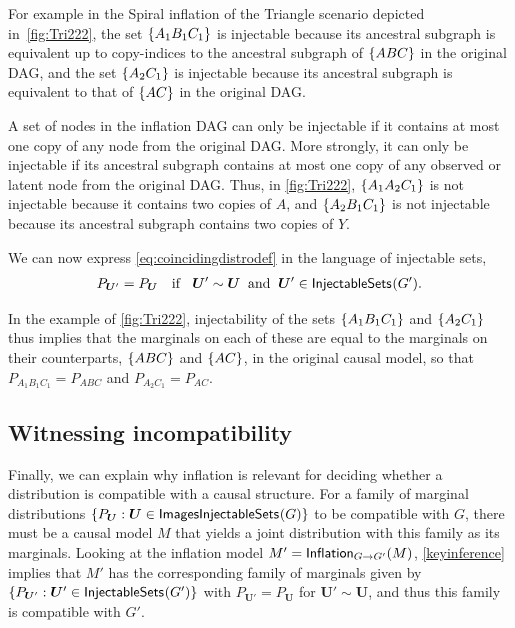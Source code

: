 \documentclass[aps,english,superscriptaddress,onecolumn,twoside,longbibliography,pra,floatfix,fleqn,nofootinbib]{revtex4-1}%
\theoremstyle{definition}
\newcounter{example}[section]
\newcommand{\SmallNamedFunction}[3][]{\operatorname{\mathsf{#2}}_{#1}\parenths{#3}}
\DeclarePairedDelimiter{\parenths}{\lparen}{\rparen}
\DeclarePairedDelimiter{\braces}{\lbrace}{\rbrace}
\newcommand{\brackets}[1]{\braces*{#1}}
\begin{document}
For example in the Spiral inflation of the Triangle scenario depicted in~\cref{fig:Tri222}, the set $\brackets{A_1 B_1 C_1}$ is injectable because its ancestral subgraph is equivalent up to copy-indices to the ancestral subgraph of $\brackets{A B C}$ in the original DAG, and the set $\brackets{A_2 C_1}$ is injectable because its ancestral subgraph is equivalent to that of $\brackets{ A C}$ in the original DAG. 

A set of nodes in the inflation DAG can only be injectable if it contains at most one copy of any node from the original DAG. More strongly, it can only be injectable if its ancestral subgraph contains at most one copy of any observed or latent node from the original DAG.  
Thus, in \cref{fig:Tri222}, $\brackets{A_1 A_2 C_1}$ is not injectable because it contains two copies of $A$, and $\brackets{A_2 B_1 C_1}$ is not injectable because its ancestral subgraph contains two copies of $Y$. 

We can now express \cref{eq:coincidingdistrodef} in the language of injectable sets,
\begin{align}\label{keyinference}
P_{\bm{U}'}=P_{\bm{U}}\quad\text{if }  \;\; \bm{U}' \sim \bm{U}\;\; \text{and} \;\; \bm{U}'\in\SmallNamedFunction{InjectableSets}{G'}.
\end{align}

In the example of \cref{fig:Tri222}, injectability of the sets $\brackets{A_1 B_1 C_1}$ and $\brackets{A_2 C_1}$ thus implies that the marginals on each of these are equal to the marginals on their counterparts, $\brackets{A B C}$ and $\brackets{A C}$, in the original causal model, so that $P_{A_1 B_1 C_1} = P_{A B C}$ and $P_{A_2 C_1} = P_{A C}$.

\subsection{Witnessing incompatibility}
\label{subsec:witnessingincompat}

Finally, we can explain why inflation is relevant for deciding whether a distribution is compatible with a causal structure.  For a family of marginal distributions $\{ P_{\bm{U}} : \bm{U} \in \SmallNamedFunction{ImagesInjectableSets}{G}\}$ to be compatible with $G$, there must be a causal model $M$ that yields a joint distribution with this family as its marginals. Looking at the inflation model $M' = \SmallNamedFunction[G\to G']{Inflation}{M}$, \cref{keyinference} implies that $M'$ has the corresponding family of marginals given by $\{ P_{\bm{U}'} : \bm{U}' \in \SmallNamedFunction{InjectableSets}{G'}\}$ with $P_{\bm{U}'} = P_{\bm{U}}$ for $\bm{U}'\sim\bm{U}$, and thus this family is compatible with $G'$.
\end{document}
